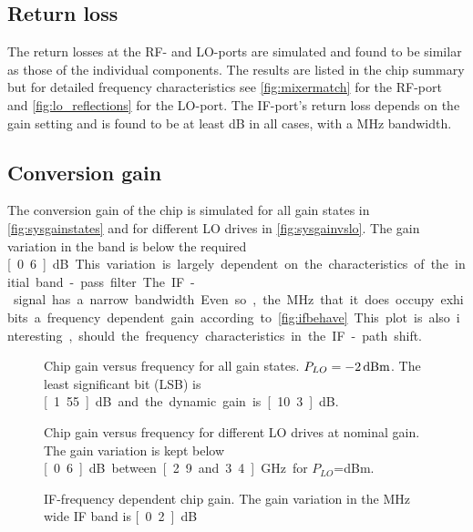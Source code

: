 		\subsection{Return loss}
			The return losses at the RF- and LO-ports are simulated and found to be similar as those of the individual components. The results are listed in the chip summary but for detailed frequency characteristics see \autoref{fig:mixermatch} for the RF-port and \autoref{fig:lo_reflections} for the LO-port. The IF-port's return loss depends on the gain setting and is found to be at least \unit[21]{dB} in all cases, with a \unit[100]{MHz} bandwidth.
			
		\subsection{Conversion gain}
			The conversion gain of the chip is simulated for all gain states in \autoref{fig:sysgainstates} and for different LO drives in \autoref{fig:sysgainvslo}. The gain variation in the band is below the required \unit[0.6]{dB}. This variation is largely dependent on the characteristics of the initial band-pass filter. 
			
			The IF-signal has a narrow bandwidth. Even so, the \unit[20]{MHz} that it does occupy exhibits a frequency dependent gain according to \autoref{fig:ifbehave}. This plot is also interesting, should the frequency characteristics in the IF-path shift.
			
			\begin{figure}[hbt!]
				\centering
				\caption[Chip gain for all gain states.]{Chip gain versus frequency for all gain states. $P_{LO}=\unit[-2]{dBm}$. The least significant bit (LSB) is \unit[1.55]{dB} and the dynamic gain is \unit[10.3]{dB}.}\label{fig:sysgainstates}
			\end{figure}
			
			\begin{figure}[hbt!]
				\centering
				\caption[Chip gain for different LO drives.]{Chip gain versus frequency for different LO drives at nominal gain. The gain variation is kept below \unit[0.6]{dB} between \unit[2.9 and 3.4]{GHz} for $P_{LO}$=\unit[-4 to 0]{dBm}.}\label{fig:sysgainvslo}
			\end{figure}
			
			\begin{figure}[hbt!]
				\centering
				\caption[IF-frequency dependent chip gain.]{IF-frequency dependent chip gain. The gain variation in the \unit[20]{MHz} wide IF band is \unit[0.2]{dB}}\label{fig:ifbehave}
			\end{figure}
			
